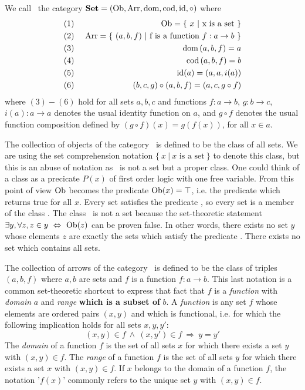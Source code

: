 \begin{defin}\label{Cat:def:set}
    We call \Set\ the category $\mbox{\bf Set}=(\mbox{\rm Ob}, \mbox{\rm Arr}, \mbox{\rm dom}, \mbox{\rm cod}, \mbox{\rm id}, \circ)$ where
    \begin{eqnarray*}
        (1)&\ &\mbox{\rm Ob} = \{\ x\ |\  \mbox{x is a set}\ \}\\
        (2)&\ &\mbox{\rm Arr} = \{\ (a,b,f)\ |\  \mbox{f is a function $f : a\to b$}\ \}\\
        (3)&\ &\mbox{\rm dom}\,(a,b,f) = a\\
        (4)&\ &\mbox{\rm cod}\,(a,b,f) = b\\
        (5)&\ &\mbox{\rm id}(a) = (a,a,i(a))\\
        (6)&\ &(b,c,g)\circ(a,b,f) = (a,c,g\circ f)
    \end{eqnarray*}
    where $(3)-(6)$ hold for all sets $a,b,c$ and functions $f:a\to b$,
    $g:b\to c$, $i(a):a\to a$ denotes the usual identity function on $a$,
    and $g\circ f$ denotes the usual function composition defined by 
    $(g\circ f)(x)=g(f(x))$, for all $x\in a$.
\end{defin}
The collection of objects of the category \Set\ is defined to be the 
class of all sets. We are using the set comprehension notation 
$\{\ x\ |\ \mbox{$x$ is a set}\ \}$ to denote this class, but this is an
abuse of notation as \ob\ is not a set but a proper class. One could 
think of a class as a precicate $P(x)$ of first order logic with one
free variable. From this point of view $\mbox{\rm Ob}$ becomes the predicate
$\mbox{\rm Ob}(x)=\top$, i.e. the predicate which returns true for all $x$.
Every set satisfies the predicate \ob, so every set is a member of 
the class \ob. The class \ob\ is not a set because the set-theoretic
statement $\exists y, \forall z, z\in y\ \Leftrightarrow\ \ob(z)$
can be proven false. In other words, there exists no set $y$ whose
elements $z$ are exactly the sets which satisfy the predicate \ob.
There exists no set which contains all sets.

The collection of arrows of the category \Set\ is defined to be the 
class of triples $(a,b,f)$ where $a,b$ are sets and $f$ is a function
$f:a\to b$. This last notation is a common set-theoretic shortcut to
express that fact that $f$ is a {\em function} with {\em domain} $a$ and 
{\em range} {\bf which is a subset of} $b$. A {\em function} is any set $f$
whose elements are ordered pairs $(x,y)$ and which is functional, i.e.
for which the following implication holds for all sets $x,y,y'$:
    \[
        (x,y)\in f\ \land\ (x,y')\in f\ \Rightarrow\ y = y'
    \]
The {\em domain} of a function $f$ is the set of all sets $x$ for which there
exists a set $y$ with $(x,y)\in f$. The {\em range} of a function $f$ is the 
set of all sets $y$ for which there exists a set $x$ with $(x,y)\in f$.
If $x$ belongs to the domain of a function $f$, the notation '$f(x)$' commonly
refers to the unique set $y$ with $(x,y)\in f$. 

